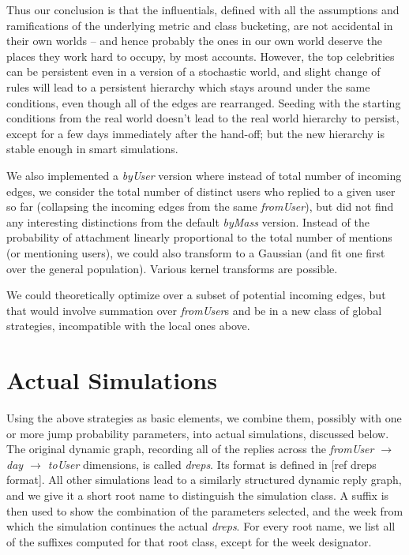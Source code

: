 \documentclass[10pt,oneside]{memoir}
\begin{document}
Thus our conclusion is that the influentials, defined with all the assumptions and ramifications of the underlying metric and class bucketing, are not accidental in their own worlds -- and hence probably the ones in our own world deserve the places they work hard to occupy, by most accounts.  However, the top celebrities can be persistent even in a version of a stochastic world, and slight change of rules will lead to a persistent hierarchy which stays around under the same conditions, even though all of the edges are rearranged.  Seeding with the starting conditions from the real world doesn't lead to the real world hierarchy to persist, except for a few days immediately after the hand-off; but the new hierarchy is stable enough in smart simulations.


We also implemented a \emph{byUser} version where instead of total number of incoming edges, we consider the total number of distinct users who replied to a given user so far (collapsing the incoming edges from the same \emph{fromUser}), but did not find any interesting distinctions from the default \emph{byMass} version.
Instead of the probability of attachment linearly proportional to the total number of mentions (or mentioning users), we could also transform to a Gaussian (and fit one first over the general population).  Various kernel transforms are possible.


We could theoretically optimize over a subset of potential incoming edges, but that would involve summation over \emph{fromUser}s and be in a new class of global strategies, incompatible with the local ones above.


\pagebreak \section{Actual Simulations}
\label{actualsimulations}

Using the above strategies as basic elements, we combine them, possibly with one or more jump probability parameters, into actual simulations, discussed below.  The original dynamic graph, recording all of the replies across the \emph{fromUser $\rightarrow$ day $\rightarrow$ toUser} dimensions, is called \emph{dreps}.  Its format is defined in [ref dreps format].  All other simulations lead to a similarly structured dynamic reply graph, and we give it a short root name to distinguish the simulation class.  A suffix is then used to show the combination of the parameters selected, and the week from which the simulation continues the actual \emph{dreps}.  For every root name, we list all of the suffixes computed for that root class, except for the week designator.
\end{document}
